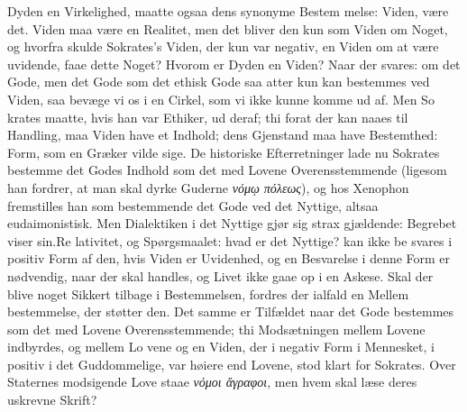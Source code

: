 \documentclass[12pt,a4paper]{book}
\newcommand{\gk}[1]{\textit{#1}}
\begin{document}
Dyden en Virkelighed, maatte ogsaa dens synonyme Bestem\-%
melse: Viden, være det. Viden maa være en Realitet, men
det bliver den kun som Viden om Noget, og hvorfra skulde
Sokrates's Viden, der kun var negativ, en Viden om at være
uvidende, faae dette Noget? Hvorom er Dyden en Viden?
Naar der svares: om det Gode, men det Gode som det ethisk
Gode saa atter kun kan bestemmes ved Viden, saa bevæge vi
os i en Cirkel, som vi ikke kunne komme ud af. Men So\-%
krates maatte, hvis han var Ethiker, ud deraf; thi forat der
kan naaes til Handling, maa Viden have et Indhold; dens
Gjenstand maa have Bestemthed: Form, som en Græker vilde
sige. De historiske Efterretninger lade nu Sokrates bestemme
det Godes Indhold som det med Lovene Overensstemmende
(ligesom han fordrer, at man skal dyrke Guderne \gk{νόμῳ πόλεως}),
og hos Xenophon fremstilles han som bestemmende det Gode
ved det Nyttige, altsaa eudaimonistisk. Men Dialektiken i
det Nyttige gjør sig strax gjældende: Begrebet viser sin.Re\-%
lativitet, og Spørgsmaalet: hvad er det Nyttige? kan ikke be\-%
svares i positiv Form af den, hvis Viden er Uvidenhed, og en
Besvarelse i denne Form er nødvendig, naar der skal handles,
og Livet ikke gaae op i en Askese. Skal der blive noget
Sikkert tilbage i Bestemmelsen, fordres der ialfald en Mellem\-%
bestemmelse, der støtter den. Det samme er Tilfældet naar
det Gode bestemmes som det med Lovene Overensstemmende;
thi Modsætningen mellem Lovene indbyrdes, og mellem Lo\-%
vene og en Viden, der i negativ Form i Mennesket, i positiv
i det Guddommelige, var høiere end Lovene, stod klart for
Sokrates. Over Staternes modsigende Love staae \gk{νόμοι ἄγραφοι},
men hvem skal læse deres uskrevne Skrift?
\end{document}
